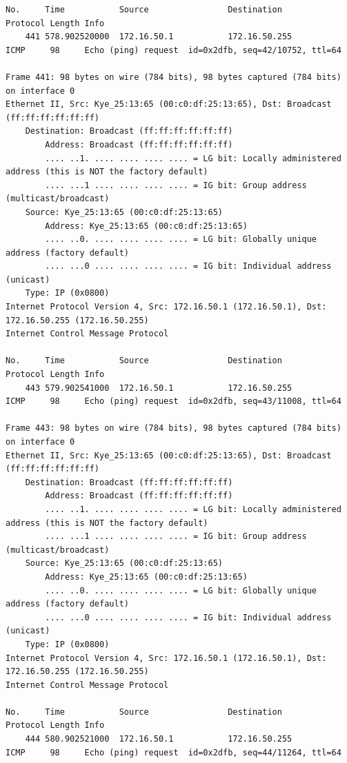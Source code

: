 \documentclass[a4paper,11pt]{article}
\begin{document}
\begin{lstlisting}
No.     Time           Source                Destination           Protocol Length Info
    441 578.902520000  172.16.50.1           172.16.50.255         ICMP     98     Echo (ping) request  id=0x2dfb, seq=42/10752, ttl=64

Frame 441: 98 bytes on wire (784 bits), 98 bytes captured (784 bits) on interface 0
Ethernet II, Src: Kye_25:13:65 (00:c0:df:25:13:65), Dst: Broadcast (ff:ff:ff:ff:ff:ff)
    Destination: Broadcast (ff:ff:ff:ff:ff:ff)
        Address: Broadcast (ff:ff:ff:ff:ff:ff)
        .... ..1. .... .... .... .... = LG bit: Locally administered address (this is NOT the factory default)
        .... ...1 .... .... .... .... = IG bit: Group address (multicast/broadcast)
    Source: Kye_25:13:65 (00:c0:df:25:13:65)
        Address: Kye_25:13:65 (00:c0:df:25:13:65)
        .... ..0. .... .... .... .... = LG bit: Globally unique address (factory default)
        .... ...0 .... .... .... .... = IG bit: Individual address (unicast)
    Type: IP (0x0800)
Internet Protocol Version 4, Src: 172.16.50.1 (172.16.50.1), Dst: 172.16.50.255 (172.16.50.255)
Internet Control Message Protocol

No.     Time           Source                Destination           Protocol Length Info
    443 579.902541000  172.16.50.1           172.16.50.255         ICMP     98     Echo (ping) request  id=0x2dfb, seq=43/11008, ttl=64

Frame 443: 98 bytes on wire (784 bits), 98 bytes captured (784 bits) on interface 0
Ethernet II, Src: Kye_25:13:65 (00:c0:df:25:13:65), Dst: Broadcast (ff:ff:ff:ff:ff:ff)
    Destination: Broadcast (ff:ff:ff:ff:ff:ff)
        Address: Broadcast (ff:ff:ff:ff:ff:ff)
        .... ..1. .... .... .... .... = LG bit: Locally administered address (this is NOT the factory default)
        .... ...1 .... .... .... .... = IG bit: Group address (multicast/broadcast)
    Source: Kye_25:13:65 (00:c0:df:25:13:65)
        Address: Kye_25:13:65 (00:c0:df:25:13:65)
        .... ..0. .... .... .... .... = LG bit: Globally unique address (factory default)
        .... ...0 .... .... .... .... = IG bit: Individual address (unicast)
    Type: IP (0x0800)
Internet Protocol Version 4, Src: 172.16.50.1 (172.16.50.1), Dst: 172.16.50.255 (172.16.50.255)
Internet Control Message Protocol

No.     Time           Source                Destination           Protocol Length Info
    444 580.902521000  172.16.50.1           172.16.50.255         ICMP     98     Echo (ping) request  id=0x2dfb, seq=44/11264, ttl=64


\end{lstlisting}
\end{document}
